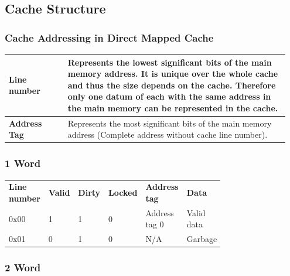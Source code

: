 	\subsection{Cache Structure }
		\subsubsection{Cache Addressing in Direct Mapped Cache}
			\begin{table}[H]
				\centering
				\begin{tabular}{|>{\bfseries}p{0.2\linewidth}|p{0.75\linewidth}|}
					\hline
					Line number
						& Represents the lowest significant bits of the main memory address. It is unique over the whole cache and thus the size depends on the cache. Therefore only one datum of each with the same address in the main memory can be represented in the cache.\\
					\hline
					Address Tag
						& Represents the most significant bits of the main memory address (Complete address without cache line number).\\
					\hline
				\end{tabular}
			\end{table} 
			
		\subsubsection {1 Word}
		
			\begin{table}[H]
				\centering
				\begin{tabular}{p{0.15\linewidth}|p{0.06\linewidth}|p{0.06\linewidth}|p{0.06\linewidth}|p{0.2\linewidth}|p{0.2\linewidth}|}
					\cline{2-6}
						\textbf{Line number}
							& \textbf{Valid}
							& \textbf{Dirty}
							& \textbf{Locked}
							& \textbf{Address tag}
							& \textbf{Data}\\
					\cline{2-6}
						0x00
							& 1
							& 1
							& 0
							& Address tag 0
							& Valid data\\
					\cline{2-6}
						0x01
							& 0
							& 1
							& 0
							& N/A
							& Garbage\\
					\cline{2-6}
				\end{tabular}
			\end{table}	
			
		\subsubsection {2 Word}
		
